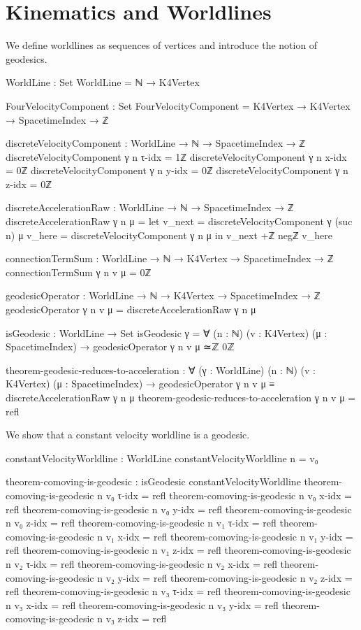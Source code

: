 \documentclass[11pt,a4paper]{book}
\begin{document}
\section{Kinematics and Worldlines}

We define worldlines as sequences of vertices and introduce the notion of geodesics.

\begin{code}
WorldLine : Set
WorldLine = ℕ → K4Vertex

FourVelocityComponent : Set
FourVelocityComponent = K4Vertex → K4Vertex → SpacetimeIndex → ℤ

discreteVelocityComponent : WorldLine → ℕ → SpacetimeIndex → ℤ
discreteVelocityComponent γ n τ-idx = 1ℤ
discreteVelocityComponent γ n x-idx = 0ℤ
discreteVelocityComponent γ n y-idx = 0ℤ
discreteVelocityComponent γ n z-idx = 0ℤ

discreteAccelerationRaw : WorldLine → ℕ → SpacetimeIndex → ℤ
discreteAccelerationRaw γ n μ = 
  let v_next = discreteVelocityComponent γ (suc n) μ
      v_here = discreteVelocityComponent γ n μ
  in v_next +ℤ negℤ v_here

connectionTermSum : WorldLine → ℕ → K4Vertex → SpacetimeIndex → ℤ
connectionTermSum γ n v μ = 0ℤ

geodesicOperator : WorldLine → ℕ → K4Vertex → SpacetimeIndex → ℤ
geodesicOperator γ n v μ = discreteAccelerationRaw γ n μ

isGeodesic : WorldLine → Set
isGeodesic γ = ∀ (n : ℕ) (v : K4Vertex) (μ : SpacetimeIndex) → 
  geodesicOperator γ n v μ ≃ℤ 0ℤ

theorem-geodesic-reduces-to-acceleration :
  ∀ (γ : WorldLine) (n : ℕ) (v : K4Vertex) (μ : SpacetimeIndex) →
  geodesicOperator γ n v μ ≡ discreteAccelerationRaw γ n μ
theorem-geodesic-reduces-to-acceleration γ n v μ = refl
\end{code}

We show that a constant velocity worldline is a geodesic.

\begin{code}
constantVelocityWorldline : WorldLine
constantVelocityWorldline n = v₀

theorem-comoving-is-geodesic : isGeodesic constantVelocityWorldline
theorem-comoving-is-geodesic n v₀ τ-idx = refl
theorem-comoving-is-geodesic n v₀ x-idx = refl
theorem-comoving-is-geodesic n v₀ y-idx = refl
theorem-comoving-is-geodesic n v₀ z-idx = refl
theorem-comoving-is-geodesic n v₁ τ-idx = refl
theorem-comoving-is-geodesic n v₁ x-idx = refl
theorem-comoving-is-geodesic n v₁ y-idx = refl
theorem-comoving-is-geodesic n v₁ z-idx = refl
theorem-comoving-is-geodesic n v₂ τ-idx = refl
theorem-comoving-is-geodesic n v₂ x-idx = refl
theorem-comoving-is-geodesic n v₂ y-idx = refl
theorem-comoving-is-geodesic n v₂ z-idx = refl
theorem-comoving-is-geodesic n v₃ τ-idx = refl
theorem-comoving-is-geodesic n v₃ x-idx = refl
theorem-comoving-is-geodesic n v₃ y-idx = refl
theorem-comoving-is-geodesic n v₃ z-idx = refl
\end{code}
\end{document}
